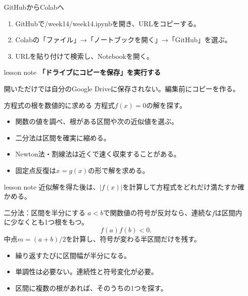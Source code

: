 \documentclass[12pt,aspectratio=43]{beamer}
\newcommand{\code}[1]{{\codefont #1}}
\newenvironment{lessonbox}
  {\begin{beamercolorbox}[wd=\linewidth,sep=1.5mm]{lesson note}}
  {\end{beamercolorbox}\par}
\begin{document}
\begin{frame}[t]{GitHubからColabへ}
  \begin{enumerate}
    \setlength{\itemsep}{4mm}
    \item GitHubで\code{2026/week14/week14.ipynb}を開き、URLをコピーする。
    \item Colabの「ファイル」→「ノートブックを開く」→「GitHub」を選ぶ。
    \item URLを貼り付けて検索し、Notebookを開く。
  \end{enumerate}
  \vspace{3mm}
  \begin{lessonbox}
    \textbf{「ドライブにコピーを保存」を実行する}\par
    \small 開いただけでは自分のGoogle Driveに保存されない。編集前にコピーを作る。
  \end{lessonbox}
\end{frame}

\begin{frame}[t]{方程式の根を数値的に求める}
  方程式\(f(x)=0\)の解を探す。
  \begin{itemize}
    \item 関数の値を調べ、根がある区間や次の近似値を選ぶ。
    \item 二分法は区間を確実に縮める。
    \item Newton法・割線法は近くで速く収束することがある。
    \item 固定点反復は\(x=g(x)\)の形で解を求める。
  \end{itemize}
  \vfill
  \begin{lessonbox}
    近似解を得た後は、\(|f(x)|\)を計算して方程式をどれだけ満たすか確かめる。
  \end{lessonbox}
\end{frame}

\begin{frame}[t]{二分法：区間を半分にする}
  \(a<b\)で関数値の符号が反対なら、連続な\(f\)は区間内に少なくとも1つ根をもつ。
  \[
    f(a)f(b)<0.
  \]
  中点\(m=(a+b)/2\)を計算し、符号が変わる半区間だけを残す。
  \begin{itemize}
    \item 繰り返すたびに区間幅が半分になる。
    \item 単調性は必要ない。連続性と符号変化が必要。
    \item 区間に複数の根があれば、そのうちの1つを探す。
  \end{itemize}
\end{frame}
\end{document}
